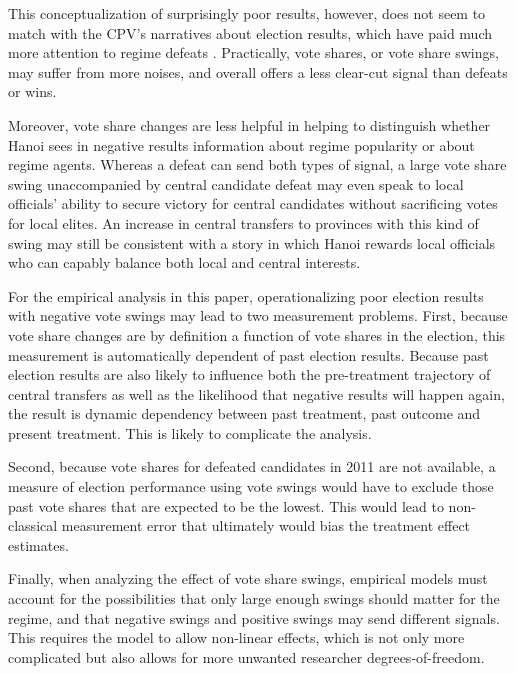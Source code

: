 \documentclass[12pt]{article}
\newcommand{\1}{\mathbbm{1}}
\begin{document}
This conceptualization of surprisingly poor results, however, does not seem to match with the CPV's narratives about election results, which have paid much more attention to regime defeats \citep[][e.g]{vov2016, laodong2016}. Practically, vote shares, or vote share swings, may suffer from more noises, and overall offers a less clear-cut signal than defeats or wins.

Moreover, vote share changes are less helpful in helping to distinguish whether Hanoi sees in negative results information about regime popularity or about regime agents. Whereas a defeat can send both types of signal, a large vote share swing unaccompanied by central candidate defeat may even speak to local officials' ability to secure victory for central candidates without sacrificing votes for local elites. An increase in central transfers to provinces with this kind of swing may still be consistent with a story in which Hanoi rewards local officials who can capably balance both local and central interests.

For the empirical analysis in this paper, operationalizing poor election results with negative vote swings may lead to two measurement problems. First, because vote share changes are by definition a function of vote shares in the election, this measurement is automatically dependent of past election results. Because past election results are also likely to influence both the pre-treatment trajectory of central transfers as well as the likelihood that negative results will happen again, the result is dynamic dependency between past treatment, past outcome and present treatment. This is likely to complicate the analysis.

Second, because vote shares for defeated candidates in 2011 are not available, a measure of election performance using vote swings would have to exclude those past vote shares that are expected to be the lowest. This would lead to non-classical measurement error that ultimately would bias the treatment effect estimates.

Finally, when analyzing the effect of vote share swings, empirical models must account for the possibilities that only large enough swings should matter for the regime, and that negative swings and positive swings may send different signals. This requires the model to allow non-linear effects, which is not only more complicated but also allows for more unwanted researcher degrees-of-freedom.
\end{document}
